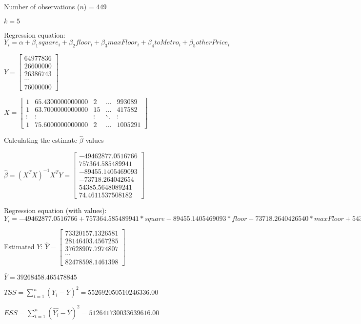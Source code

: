 \documentclass{article}
\begin{document}
Number of observations ($n$) = 449

$k=5$

Regression equation: 
$Y_i=\alpha+\beta_1square_i+\beta_2floor_i+\beta_3maxFloor_i+\beta_4toMetro_i+\beta_5otherPrice_i$


$Y=\left[\begin{matrix}64977836\\26600000\\26386743\\\cdots\\76000000\end{matrix}\right]$


$X=\begin{bmatrix}1 & 65.4300000000000 & 2 & \dots  & 993089 \\ 1 & 63.7000000000000 & 15 & \dots  & 417582 \\ \vdots & \vdots & \vdots & \ddots & \vdots \\ 1 & 75.6000000000000 & 2 & \dots  & 1005291\end{bmatrix}$

Calculating the estimate $\hat\beta$ values

$\hat{\beta}=(X^TX)^{-1}X^TY=\left[\begin{matrix}-49462877.0516766\\757364.585489941\\-89455.1405469093\\-73718.264042654\\54385.5648089241\\74.4611537508182\end{matrix}\right]$

Regression equation (with values): $Y_i=-49462877.0516766+757364.585489941*square-89455.1405469093*floor-73718.2640426540*maxFloor+54385.5648089241*toMetro+74.4611537508182*otherPrice$


Estimated $Y$: $\hat{Y}=\left[\begin{matrix}73320157.1326581\\28146403.4567285\\37628907.7974807\\\cdots\\82478598.1461398\end{matrix}\right]$

$\overline{Y}=39268458.465478845$

$TSS=\sum_{t=1}^{n} (Y_i-\overline{Y})^2=552692050510246336.00$

$ESS=\sum_{t=1}^{n} (\hat{Y_i}-\overline{Y})^2=512641730033639616.00$
\end{document}
